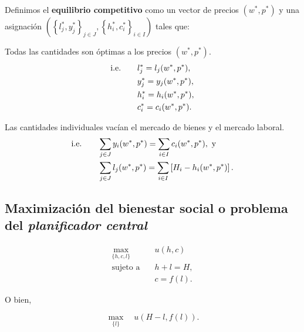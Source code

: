 \documentclass[8pt,a4paper]{extarticle}
\begin{document}
\begin{multicols}{3}
	\begin{boxdef}
		Definimos el \textbf{equilibrio competitivo} como un vector de precios $(w^*, p^*)$ y una asignación $\left( \left\{ l^*_j, y^*_j \right\}_{j \in J}, \left\{ h^*_i, c^*_i \right\}_{i \in I} \right)$ tales que:
		\begin{eqlist}
			\item Todas las cantidades son óptimas a los precios $(w^*, p^*)$.
			\begin{equation*}
				\begin{aligned}
					\text{\normalfont i.e.} \qquad & l^*_j = l_j(w^*, p^*), \\
					           & y^*_j = y_j(w^*, p^*), \\
					           & h^*_i = h_i(w^*, p^*), \\
					           & c^*_i = c_i(w^*, p^*).
				\end{aligned}
			\end{equation*}
			\item Las cantidades individuales vacían el mercado de bienes y el mercado laboral.
			\begin{equation*}
				\begin{aligned}
					\text{\normalfont i.e.} \qquad & \sum_{j \in J} y_i(w^*, p^*) = \sum_{i \in I} c_i(w^*, p^*),\ \text{y}            \\
					           & \sum_{j \in J} l_j(w^*, p^*) = \sum_{i \in I} \left[ H_i - h_i(w^*, p^*) \right].
				\end{aligned}
			\end{equation*}
		\end{eqlist}
	\end{boxdef}

	\subsection{Maximización del bienestar social o problema del \emph{planificador central}}

	\begin{equation*}
		\begin{aligned}
			\max_{\{h, c, l\}} \quad & u(h, c)    \\
			\text{sujeto a} \quad    & h + l = H, \\
			                         & c = f(l).
		\end{aligned}
	\end{equation*}

	O bien,

	\[
		\max_{\{l\}} \quad u(H - l, f(l))
		.\]


\end{multicols}
\end{document}
